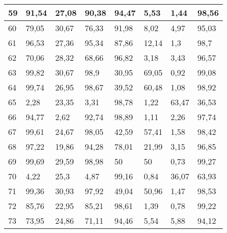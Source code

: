 \begin{longtable}[c]{|l|l|l|l|l|l|l|l|}
59              & 91,54        & 27,08        & 90,38       & 94,47         & 5,53          & 1,44          & 98,56         \\ \hline
60              & 79,05        & 30,67        & 76,33       & 91,98         & 8,02          & 4,97          & 95,03         \\ \hline
61              & 96,53        & 27,36        & 95,34       & 87,86         & 12,14         & 1,3           & 98,7          \\ \hline
62              & 70,06        & 28,32        & 68,66       & 96,82         & 3,18          & 3,43          & 96,57         \\ \hline
63              & 99,82        & 30,67        & 98,9        & 30,95         & 69,05         & 0,92          & 99,08         \\ \hline
64              & 99,74        & 26,95        & 98,67       & 39,52         & 60,48         & 1,08          & 98,92         \\ \hline
65              & 2,28         & 23,35        & 3,31        & 98,78         & 1,22          & 63,47         & 36,53         \\ \hline
66              & 94,77        & 2,62         & 92,74       & 98,89         & 1,11          & 2,26          & 97,74         \\ \hline
67              & 99,61        & 24,67        & 98,05       & 42,59         & 57,41         & 1,58          & 98,42         \\ \hline
68              & 97,22        & 19,86        & 94,28       & 78,01         & 21,99         & 3,15          & 96,85         \\ \hline
69              & 99,69        & 29,59        & 98,98       & 50            & 50            & 0,73          & 99,27         \\ \hline
70              & 4,22         & 25,3         & 4,87        & 99,16         & 0,84          & 36,07         & 63,93         \\ \hline
71              & 99,36        & 30,93        & 97,92       & 49,04         & 50,96         & 1,47          & 98,53         \\ \hline
72              & 85,76        & 22,95        & 85,21       & 98,61         & 1,39          & 0,78          & 99,22         \\ \hline
73              & 73,95        & 24,86        & 71,11       & 94,46         & 5,54          & 5,88          & 94,12         \\ \hline

\end{longtable}
